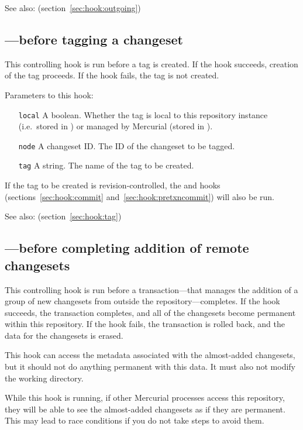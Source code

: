See also:  (section~\ref{sec:hook:outgoing})

\subsection{---before tagging a changeset}
\label{sec:hook:pretag}

This controlling hook is run before a tag is created.  If the hook
succeeds, creation of the tag proceeds.  If the hook fails, the tag is
not created.

Parameters to this hook:
\begin{itemize}
\item[\texttt{local}] A boolean.  Whether the tag is local to this
  repository instance (i.e.~stored in ) or managed
  by Mercurial (stored in ).
\item[\texttt{node}] A changeset ID.  The ID of the changeset to be tagged.
\item[\texttt{tag}] A string.  The name of the tag to be created.
\end{itemize}

If the tag to be created is revision-controlled, the 
and  hooks (sections~\ref{sec:hook:commit}
and~\ref{sec:hook:pretxncommit}) will also be run.

See also:  (section~\ref{sec:hook:tag})

\subsection{---before completing addition of
  remote changesets}
\label{sec:hook:pretxnchangegroup}

This controlling hook is run before a transaction---that manages the
addition of a group of new changesets from outside the
repository---completes.  If the hook succeeds, the transaction
completes, and all of the changesets become permanent within this
repository.  If the hook fails, the transaction is rolled back, and
the data for the changesets is erased.

This hook can access the metadata associated with the almost-added
changesets, but it should not do anything permanent with this data.
It must also not modify the working directory.

While this hook is running, if other Mercurial processes access this
repository, they will be able to see the almost-added changesets as if
they are permanent.  This may lead to race conditions if you do not
take steps to avoid them.

